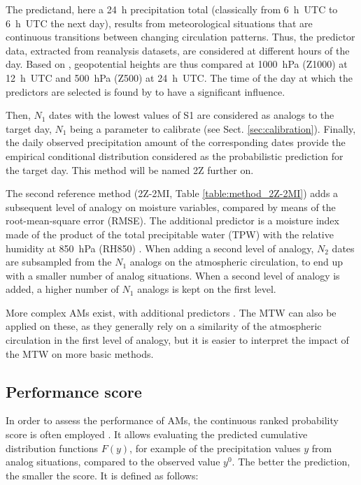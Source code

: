 \documentclass[hess, manuscript]{copernicus}
\begin{document}
The predictand, here a 24~h precipitation total (classically from 6~h~UTC to 6~h~UTC the next day), results from meteorological situations that are continuous transitions between changing circulation patterns. Thus, the predictor data, extracted from reanalysis datasets, are considered at different hours of the day. Based on \citet{Bontron2005}, geopotential heights are thus compared at 1000~hPa (Z1000) at 12~h~UTC and 500~hPa (Z500) at 24~h~UTC. The time of the day at which the predictors are selected is found by \citet{Bontron2004} to have a significant influence.

Then, $N_{1}$ dates with the lowest values of S1 are considered as analogs to the target day, $N_{1}$ being a parameter to calibrate (see Sect. \ref{sec:calibration}). Finally, the daily observed precipitation amount of the corresponding dates provide the empirical conditional distribution considered as the probabilistic prediction for the target day. This method will be named 2Z further on.

The second reference method (2Z-2MI, Table \ref{table:method_2Z-2MI}) adds a subsequent level of analogy on moisture variables, compared by means of the root-mean-square error (RMSE). The additional predictor is a moisture index made of the product of the total precipitable water (TPW) with the relative humidity at 850~hPa (RH850) \citep{Bontron2004}. When adding a second level of analogy, $N_{2}$ dates are subsampled from the $N_{1}$ analogs on the atmospheric circulation, to end up with a smaller number of analog situations. When a second level of analogy is added, a higher number of $N_{1}$ analogs is kept on the first level.

More complex AMs exist, with additional predictors \citep[see e.g.][]{Horton2012a, BenDaoud2016, Caillouet2016}. The MTW can also be applied on these, as they generally rely on a similarity of the atmospheric circulation in the first level of analogy, but it is easier to interpret the impact of the MTW on more basic methods.


\subsection{Performance score}
\label{sec:performance}

In order to assess the performance of AMs, the continuous ranked probability score \citep[CRPS,][]{Brown1974, Matheson1976, Hersbach2000} is often employed \citep[see, e.g.,][]{Bontron2004, Bontron2005, BenDaoud2008, Horton2012, Marty2012, Radanovics2013, Chardon2014, Junk2015, BenDaoud2016, Caillouet2016}. It allows evaluating the predicted cumulative distribution functions $F(y)$, for example of the precipitation values $y$ from analog situations, compared to the observed value $y^{0}$. The better the prediction, the smaller the score. It is defined as follows:
\end{document}
